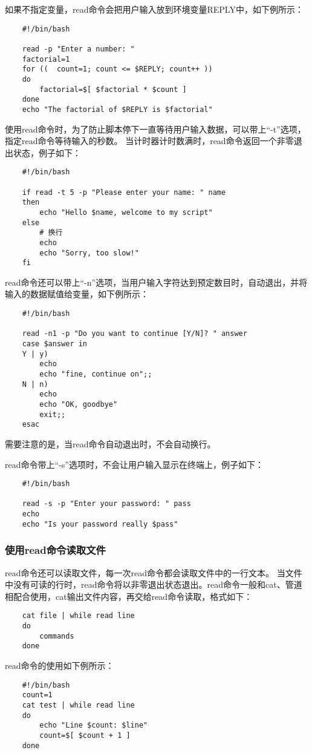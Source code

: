 \documentclass[a4paper,left=2.5cm,right=2.5cm,11pt]{article}
\begin{document}
	如果不指定变量，read命令会把用户输入放到环境变量REPLY中，如下例所示：
	\begin{lstlisting}
	#!/bin/bash

	read -p "Enter a number: "
	factorial=1
	for ((  count=1; count <= $REPLY; count++ ))
	do
		factorial=$[ $factorial * $count ]
	done
	echo "The factorial of $REPLY is $factorial"
	\end{lstlisting}

	使用read命令时，为了防止脚本停下一直等待用户输入数据，可以带上“-t”选项，指定read命令等待输入的秒数。
	当计时器计时数满时，read命令返回一个非零退出状态，例子如下：
	\begin{lstlisting}
	#!/bin/bash

	if read -t 5 -p "Please enter your name: " name
	then
		echo "Hello $name, welcome to my script"
	else
		# 换行
		echo
		echo "Sorry, too slow!"
	fi
	\end{lstlisting}

	read命令还可以带上“-n”选项，当用户输入字符达到预定数目时，自动退出，并将输入的数据赋值给变量，如下例所示：
	\begin{lstlisting}
	#!/bin/bash

	read -n1 -p "Do you want to continue [Y/N]? " answer
	case $answer in
	Y | y)
		echo
		echo "fine, continue on";;
	N | n)
		echo
		echo "OK, goodbye"
		exit;;
	esac
	\end{lstlisting}

	需要注意的是，当read命令自动退出时，不会自动换行。\par

	read命令带上“-s”选项时，不会让用户输入显示在终端上，例子如下：
	\begin{lstlisting}
	#!/bin/bash

	read -s -p "Enter your password: " pass
	echo
	echo "Is your password really $pass"
	\end{lstlisting}

\subsubsection{使用read命令读取文件}
	read命令还可以读取文件，每一次read命令都会读取文件中的一行文本。
	当文件中没有可读的行时，read命令将以非零退出状态退出。read命令一般和cat、管道相配合使用，cat输出文件内容，再交给read命令读取，格式如下：
	\begin{lstlisting}
	cat file | while read line
	do
		commands
	done
	\end{lstlisting}
	
	read命令的使用如下例所示：
	\begin{lstlisting}
	#!/bin/bash
	count=1
	cat test | while read line
	do
		echo "Line $count: $line"
		count=$[ $count + 1 ]
	done
	\end{lstlisting}
\end{document}
